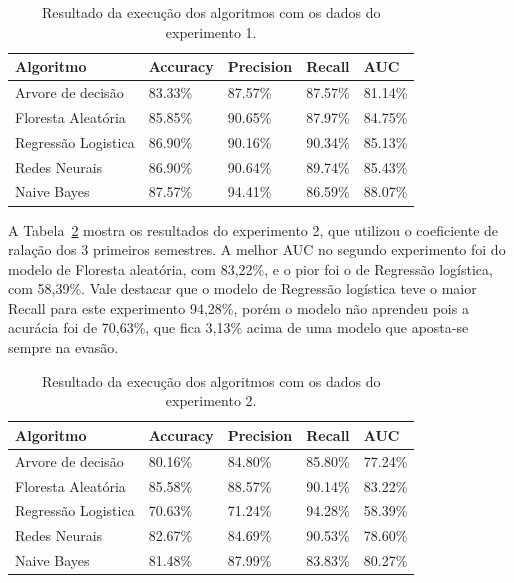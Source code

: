 \documentclass[diss,capa]{texufpel}
\begin{document}
\begin{table}[htbp]
\footnotesize\addtolength{\tabcolsep}{-3pt}
\begin{center}
\caption{Resultado da execução dos algoritmos com os dados do experimento 1.}
\label{tab:resultado-experimento-1}
\begin{tabular}{p{4cm}p{2cm}p{2cm}p{2cm}p{2cm}} 
\hline
Algoritmo           & \multicolumn{1}{l}{Accuracy} & \multicolumn{1}{l}{Precision} & \multicolumn{1}{l}{Recall} & \multicolumn{1}{l}{AUC} \\ \hline
Arvore de decisão	& 83.33\%	& 87.57\%	& 87.57\%	& 81.14\% \\
Floresta Aleatória	& 85.85\%	& 90.65\%	& 87.97\%	& 84.75\% \\
Regressão Logistica	& 86.90\%	& 90.16\%	& 90.34\%	& 85.13\% \\
Redes Neurais	    & 86.90\%	& 90.64\%	& 89.74\%	& 85.43\% \\
Naive Bayes	        & 87.57\%	& 94.41\%	& 86.59\%	& 88.07\% \\  \hline
\end{tabular}
\end{center}
\end{table}


A Tabela~\ref{tab:resultado-experimento-2} mostra os resultados do experimento 2, que utilizou o coeficiente de ralação dos 3 primeiros semestres.
A melhor AUC no segundo experimento foi do modelo de Floresta aleatória, com 83,22\%, e o pior foi o de Regressão logística, com 58,39\%.
Vale destacar que o modelo de Regressão logística teve o maior Recall para este experimento 94,28\%, porém o modelo não aprendeu pois a acurácia foi de 70,63\%, que fica 3,13\% acima de uma modelo que aposta-se sempre na evasão.

\begin{table}[htbp]
\footnotesize\addtolength{\tabcolsep}{-3pt}
\begin{center}
\caption{Resultado da execução dos algoritmos com os dados do experimento 2.}
\label{tab:resultado-experimento-2}
\begin{tabular}{p{4cm}p{2cm}p{2cm}p{2cm}p{2cm}} 
\hline
Algoritmo           & \multicolumn{1}{l}{Accuracy} & \multicolumn{1}{l}{Precision} & \multicolumn{1}{l}{Recall} & \multicolumn{1}{l}{AUC} \\ \hline
Arvore de decisão	& 80.16\%	& 84.80\%	& 85.80\%	& 77.24\% \\
Floresta Aleatória	& 85.58\%	& 88.57\%	& 90.14\%	& 83.22\% \\
Regressão Logistica	& 70.63\%	& 71.24\%	& 94.28\%	& 58.39\% \\
Redes Neurais	    & 82.67\%	& 84.69\%	& 90.53\%	& 78.60\% \\
Naive Bayes	        & 81.48\%	& 87.99\%	& 83.83\%	& 80.27\% \\ \hline
\end{tabular}
\end{center}
\end{table}
\end{document}
